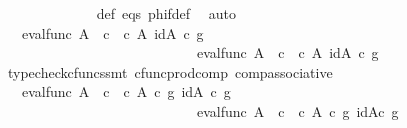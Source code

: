 \begin{isabellebody}
\ \ \ \ \ \ \ \ \ \ \ \ \isamarkupfalse%
\ {\isasymphi}{\isacharunderscore}{\kern0pt}def\ eqs\ phi{\isacharunderscore}{\kern0pt}f{\isacharunderscore}{\kern0pt}def\ \isamarkupfalse%
\ auto\isanewline
\ \ \ \ \ \ \ \ \ \ \isamarkupfalse%
\ \isamarkupfalse%
\ {\isachardoublequoteopen}{\isachardot}{\kern0pt}{\isachardot}{\kern0pt}{\isachardot}{\kern0pt}\ {\isacharequal}{\kern0pt}\ {\isasymlangle}eval{\isacharunderscore}{\kern0pt}func\ A\ {\isasymOmega}\ {\isasymcirc}\isactrlsub c\ {\isasymlangle}{\isasymt}\ {\isasymcirc}\isactrlsub c\ {\isasymbeta}\isactrlbsub A\isactrlbsup {\isasymOmega}\isactrlesup \isactrlesub {\isacharcomma}{\kern0pt}\ id{\isacharparenleft}{\kern0pt}A\isactrlbsup {\isasymOmega}\isactrlesup {\isacharparenright}{\kern0pt}{\isasymrangle}\ {\isasymcirc}\isactrlsub c\ g\ {\isacharcomma}{\kern0pt}\isanewline
\ \ \ \ \ \ \ \ \ \ \ \ \ \ \ \ \ \ \ \ \ \ \ \ \ \ \ \ eval{\isacharunderscore}{\kern0pt}func\ A\ {\isasymOmega}\ {\isasymcirc}\isactrlsub c\ {\isasymlangle}{\isasymf}\ {\isasymcirc}\isactrlsub c\ {\isasymbeta}\isactrlbsub A\isactrlbsup {\isasymOmega}\isactrlesup \isactrlesub {\isacharcomma}{\kern0pt}\ id{\isacharparenleft}{\kern0pt}A\isactrlbsup {\isasymOmega}\isactrlesup {\isacharparenright}{\kern0pt}{\isasymrangle}\ {\isasymcirc}\isactrlsub c\ g{\isasymrangle}{\isachardoublequoteclose}\isanewline
\ \ \ \ \ \ \ \ \ \ \ \ \isamarkupfalse%
\ {\isacharparenleft}{\kern0pt}typecheck{\isacharunderscore}{\kern0pt}cfuncs{\isacharcomma}{\kern0pt}smt\ cfunc{\isacharunderscore}{\kern0pt}prod{\isacharunderscore}{\kern0pt}comp\ comp{\isacharunderscore}{\kern0pt}associative{}{\isacharparenright}{\kern0pt}\isanewline
\ \ \ \ \ \ \ \ \ \ \isamarkupfalse%
\ \isamarkupfalse%
\ {\isachardoublequoteopen}{\isachardot}{\kern0pt}{\isachardot}{\kern0pt}{\isachardot}{\kern0pt}\ {\isacharequal}{\kern0pt}\ {\isasymlangle}eval{\isacharunderscore}{\kern0pt}func\ A\ {\isasymOmega}\ {\isasymcirc}\isactrlsub c\ {\isasymlangle}{\isasymt}\ {\isasymcirc}\isactrlsub c\ {\isasymbeta}\isactrlbsub A\isactrlbsup {\isasymOmega}\isactrlesup \isactrlesub \ {\isasymcirc}\isactrlsub c\ g{\isacharcomma}{\kern0pt}\ id{\isacharparenleft}{\kern0pt}A\isactrlbsup {\isasymOmega}\isactrlesup {\isacharparenright}{\kern0pt}\ {\isasymcirc}\isactrlsub c\ g{\isasymrangle}{\isacharcomma}{\kern0pt}\isanewline
\ \ \ \ \ \ \ \ \ \ \ \ \ \ \ \ \ \ \ \ \ \ \ \ \ \ \ \ eval{\isacharunderscore}{\kern0pt}func\ A\ {\isasymOmega}\ {\isasymcirc}\isactrlsub c\ {\isasymlangle}{\isasymf}\ {\isasymcirc}\isactrlsub c\ {\isasymbeta}\isactrlbsub A\isactrlbsup {\isasymOmega}\isactrlesup \isactrlesub \ {\isasymcirc}\isactrlsub c\ g{\isacharcomma}{\kern0pt}\ id{\isacharparenleft}{\kern0pt}A\isactrlbsup {\isasymOmega}\isactrlesup {\isacharparenright}{\kern0pt}{\isasymcirc}\isactrlsub c\ g\ {\isasymrangle}{\isasymrangle}{\isachardoublequoteclose}\isanewline

\end{isabellebody}
